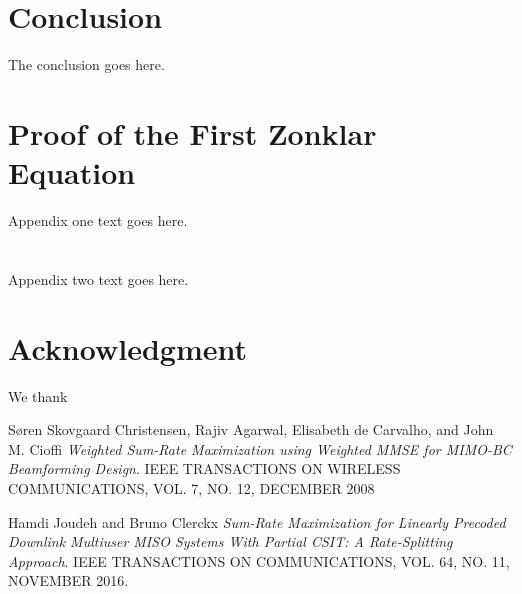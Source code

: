 \documentclass[journal]{IEEEtran}
\begin{document}
\section{Conclusion}
The conclusion goes here.






%


\appendices
\section{Proof of the First Zonklar Equation}
Appendix one text goes here.

\section{}
Appendix two text goes here.


\section*{Acknowledgment}
We thank 
\ifCLASSOPTIONcaptionsoff
  \newpage
\fi

\begin{thebibliography}{1}

S\o{}ren Skovgaard Christensen, Rajiv Agarwal, Elisabeth de Carvalho, and John M. Cioffi 
\textit{Weighted Sum-Rate Maximization using Weighted MMSE for
MIMO-BC Beamforming Design}. 
IEEE TRANSACTIONS ON WIRELESS COMMUNICATIONS, VOL. 7, NO. 12, DECEMBER 2008

Hamdi Joudeh and Bruno Clerckx 
\textit{Sum-Rate Maximization for Linearly Precoded Downlink Multiuser MISO Systems With Partial CSIT: A Rate-Splitting Approach}. 
IEEE TRANSACTIONS ON COMMUNICATIONS, VOL. 64, NO. 11, NOVEMBER 2016.
\end{thebibliography}
\end{document}
